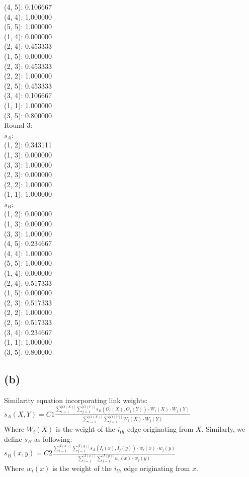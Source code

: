\documentclass{article}
\newenvironment{myenv}[1]
  {\begin{spacing}{#1}}
  {\end{spacing}}
\begin{document}
\begin{myenv}{0.8}
(4, 5): 0.106667 \\
(4, 4): 1.000000 \\
(5, 5): 1.000000 \\
(1, 4): 0.000000 \\
(2, 4): 0.453333 \\
(1, 5): 0.000000 \\
(2, 3): 0.453333 \\
(2, 2): 1.000000 \\
(2, 5): 0.453333 \\
(3, 4): 0.106667 \\
(1, 1): 1.000000 \\
(3, 5): 0.800000 \\
Round 3:\\ 
$s_A$:\\
(1, 2): 0.343111 \\
(1, 3): 0.000000 \\
(3, 3): 1.000000 \\
(2, 3): 0.000000 \\
(2, 2): 1.000000 \\
(1, 1): 1.000000 \\
$s_B$:\\
(1, 2): 0.000000 \\
(1, 3): 0.000000 \\
(3, 3): 1.000000 \\
(4, 5): 0.234667 \\
(4, 4): 1.000000 \\
(5, 5): 1.000000 \\
(1, 4): 0.000000 \\
(2, 4): 0.517333 \\
(1, 5): 0.000000 \\
(2, 3): 0.517333 \\
(2, 2): 1.000000 \\
(2, 5): 0.517333 \\
(3, 4): 0.234667 \\
(1, 1): 1.000000 \\
(3, 5): 0.800000 \\
\end{myenv}

\subsection{(b)}
Similarity equation incorporating link weights:\\
$s_A(X, Y) = C1\frac{ 
  \sum\limits_{i=1}^{|O(X)|} \sum\limits_{j=1}^{|O(Y)|} 
    s_B(O_i(X), O_j(Y))\cdot W_i(X)\cdot W_j(Y)
  }{
   \sum\limits_{i=1}^{|O(X)|} \sum\limits_{j=1}^{|O(Y)|}
    W_i(X)\cdot W_j(Y)
  } $ \\
Where $W_i(X)$ is the weight of the $i_{th}$ edge originating from $X$.
Similarly, we define $s_B$ as following: \\
$s_B(x, y) = C2\frac{ 
  \sum\limits_{i=1}^{|I(x)|} \sum\limits_{j=1}^{|I(y)|} 
    s_A(I_i(x), I_j(y))\cdot w_i(x)\cdot w_j(y)
  }{
    \sum\limits_{i=1}^{|I(x)|} \sum\limits_{j=1}^{|I(y)|} 
    w_i(x)\cdot w_j(y)
  } $ \\
Where $w_i(x)$ is the weight of the $i_{th}$ edge originating from $x$.
\end{document}
